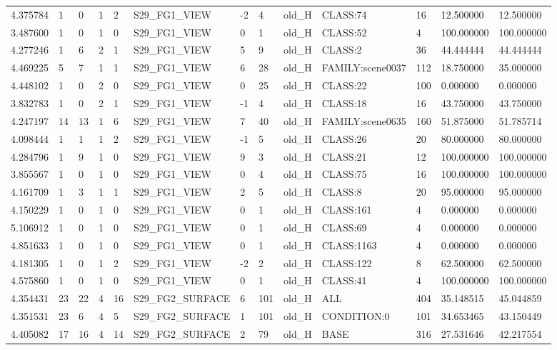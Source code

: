 \begin{tabular}{lllllllllllll}
4.375784 & 1 & 0 & 1 & 2 & S29\_FG1\_VIEW & -2 & 4 & old\_H & CLASS:74 & 16 & 12.500000 & 12.500000 \\
3.487600 & 1 & 0 & 1 & 0 & S29\_FG1\_VIEW & 0 & 1 & old\_H & CLASS:52 & 4 & 100.000000 & 100.000000 \\
4.277246 & 1 & 6 & 2 & 1 & S29\_FG1\_VIEW & 5 & 9 & old\_H & CLASS:2 & 36 & 44.444444 & 44.444444 \\
4.469225 & 5 & 7 & 1 & 1 & S29\_FG1\_VIEW & 6 & 28 & old\_H & FAMILY:scene0037 & 112 & 18.750000 & 35.000000 \\
4.448102 & 1 & 0 & 2 & 0 & S29\_FG1\_VIEW & 0 & 25 & old\_H & CLASS:22 & 100 & 0.000000 & 0.000000 \\
3.832783 & 1 & 0 & 2 & 1 & S29\_FG1\_VIEW & -1 & 4 & old\_H & CLASS:18 & 16 & 43.750000 & 43.750000 \\
4.247197 & 14 & 13 & 1 & 6 & S29\_FG1\_VIEW & 7 & 40 & old\_H & FAMILY:scene0635 & 160 & 51.875000 & 51.785714 \\
4.098444 & 1 & 1 & 1 & 2 & S29\_FG1\_VIEW & -1 & 5 & old\_H & CLASS:26 & 20 & 80.000000 & 80.000000 \\
4.284796 & 1 & 9 & 1 & 0 & S29\_FG1\_VIEW & 9 & 3 & old\_H & CLASS:21 & 12 & 100.000000 & 100.000000 \\
3.855567 & 1 & 0 & 1 & 0 & S29\_FG1\_VIEW & 0 & 4 & old\_H & CLASS:75 & 16 & 100.000000 & 100.000000 \\
4.161709 & 1 & 3 & 1 & 1 & S29\_FG1\_VIEW & 2 & 5 & old\_H & CLASS:8 & 20 & 95.000000 & 95.000000 \\
4.150229 & 1 & 0 & 1 & 0 & S29\_FG1\_VIEW & 0 & 1 & old\_H & CLASS:161 & 4 & 0.000000 & 0.000000 \\
5.106912 & 1 & 0 & 1 & 0 & S29\_FG1\_VIEW & 0 & 1 & old\_H & CLASS:69 & 4 & 0.000000 & 0.000000 \\
4.851633 & 1 & 0 & 1 & 0 & S29\_FG1\_VIEW & 0 & 1 & old\_H & CLASS:1163 & 4 & 0.000000 & 0.000000 \\
4.181305 & 1 & 0 & 1 & 2 & S29\_FG1\_VIEW & -2 & 2 & old\_H & CLASS:122 & 8 & 62.500000 & 62.500000 \\
4.575860 & 1 & 0 & 1 & 0 & S29\_FG1\_VIEW & 0 & 1 & old\_H & CLASS:41 & 4 & 100.000000 & 100.000000 \\
4.354431 & 23 & 22 & 4 & 16 & S29\_FG2\_SURFACE & 6 & 101 & old\_H & ALL & 404 & 35.148515 & 45.044859 \\
4.351531 & 23 & 6 & 4 & 5 & S29\_FG2\_SURFACE & 1 & 101 & old\_H & CONDITION:0 & 101 & 34.653465 & 43.150449 \\
4.405082 & 17 & 16 & 4 & 14 & S29\_FG2\_SURFACE & 2 & 79 & old\_H & BASE & 316 & 27.531646 & 42.217554 \\

\end{tabular}
